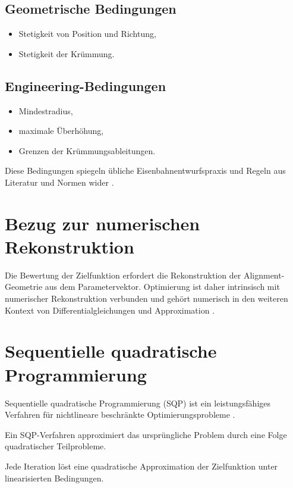 \subsection{Geometrische Bedingungen}
\begin{itemize}
\item Stetigkeit von Position und Richtung,
\item Stetigkeit der Krümmung.
\end{itemize}

\subsection{Engineering-Bedingungen}
\begin{itemize}
\item Mindestradius,
\item maximale Überhöhung,
\item Grenzen der Krümmungsableitungen.
\end{itemize}
Diese Bedingungen spiegeln übliche Eisenbahnentwurfspraxis und Regeln aus
Literatur und Normen wider \cite{Klein1998Trassierung,EN13803_2017}.

\section{Bezug zur numerischen Rekonstruktion}
Die Bewertung der Zielfunktion erfordert die Rekonstruktion der
Alignment-Geometrie aus dem Parametervektor. Optimierung ist daher intrinsisch
mit numerischer Rekonstruktion verbunden und gehört numerisch in den weiteren
Kontext von Differentialgleichungen und Approximation
\cite{Hairer1993ODE,Press2007NumericalRecipes}.

\section{Sequentielle quadratische Programmierung}
Sequentielle quadratische Programmierung (SQP) ist ein leistungsfähiges
Verfahren für nichtlineare beschränkte Optimierungsprobleme
\cite{Nocedal2006NumericalOptimization}.
\begin{definition}
Ein SQP-Verfahren approximiert das ursprüngliche Problem durch eine Folge
quadratischer Teilprobleme.
\end{definition}
Jede Iteration löst eine quadratische Approximation der Zielfunktion unter
linearisierten Bedingungen.

